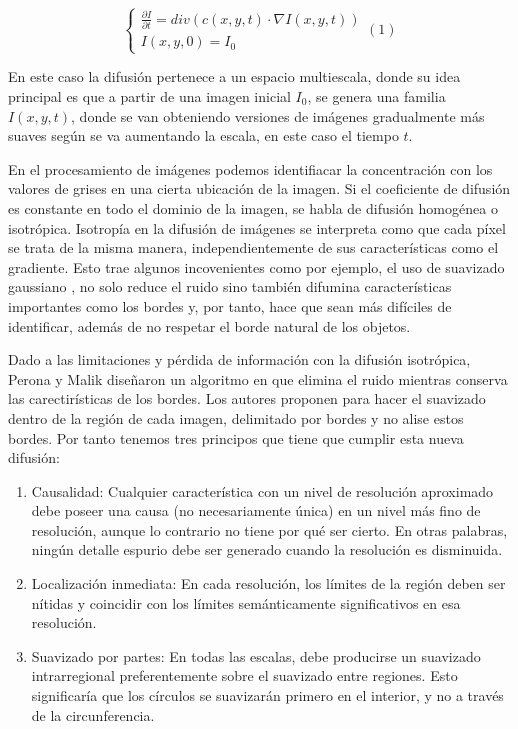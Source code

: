 \documentclass[a4paper,10pt,twocolumn]{article}
\begin{document}
$$
\begin{cases}
\frac{\partial I}{\partial t} = div(c(x,y,t) \cdot \nabla I(x,y,t)) \\
I(x,y,0) = I_0
\end{cases}  
(1)
$$

En este caso la difusi\'on pertenece a un espacio multiescala, donde su idea principal es que a partir de una imagen inicial $I_0$, se genera una familia $I(x,y,t)$, donde se van obteniendo versiones de im\'agenes gradualmente m\'as suaves seg\'un se va aumentando la escala, en este caso el tiempo $t$.

En el procesamiento de im\'agenes podemos identifiacar la concentraci\'on con los valores de grises en una cierta ubicaci\'on de la imagen. Si el coeficiente de difusi\'on es constante en todo el dominio de la imagen, se habla de difusi\'on homog\'enea o isotr\'opica. Isotrop\'ia en la difusi\'on de im\'agenes se interpreta como que cada p\'ixel se trata de la misma manera, independientemente de sus caracter\'isticas como el gradiente. Esto trae algunos incovenientes como por ejemplo, el uso de suavizado gaussiano \cite{galic}, no solo reduce el ruido sino tambi\'en difumina caracter\'isticas importantes como los bordes y, por tanto, hace que sean m\'as dif\'iciles de identificar, adem\'as de no respetar el borde natural de los objetos.

Dado a las limitaciones y p\'erdida de informaci\'on con la difusi\'on isotr\'opica, Perona y Malik dise\~naron un algoritmo en \cite{perona_malik} que elimina el ruido mientras conserva las carectir\'isticas de los bordes. Los autores proponen para hacer el suavizado dentro de la regi\'on de cada imagen, delimitado por bordes y no alise estos bordes. Por tanto tenemos tres principos que tiene que cumplir esta nueva difusi\'on:

\begin{enumerate} 
\item {Causalidad: Cualquier caracter\'istica con un nivel de resoluci\'on aproximado debe poseer una causa (no necesariamente \'unica) en un nivel m\'as fino de resolución, aunque lo contrario no tiene por qu\'e ser cierto. En otras palabras, ning\'un detalle espurio debe ser generado cuando la resoluci\'on es disminuida.}
\item {Localizaci\'on inmediata: En cada resoluci\'on, los l\'imites de la regi\'on deben ser n\'itidas y coincidir con los l\'imites sem\'anticamente significativos en esa resoluci\'on.}
\item {Suavizado por partes: En todas las escalas, debe producirse un suavizado intrarregional preferentemente sobre el suavizado entre regiones. Esto significar\'ia que los c\'irculos se suavizar\'an primero en el interior, y no a trav\'es de la circunferencia.}
\end{enumerate}
\end{document}
